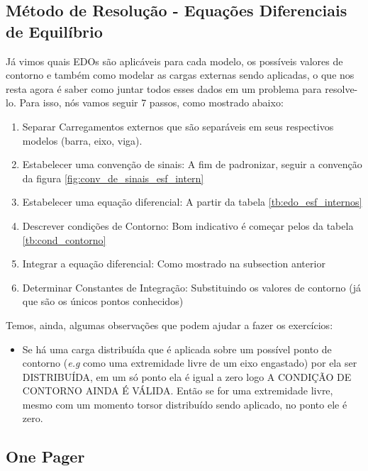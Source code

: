 \documentclass{article}
\begin{document}
            \subsection{Método de Resolução - Equações Diferenciais de Equilíbrio}
                Já vimos quais EDOs são aplicáveis para cada modelo, os possíveis valores de contorno e também como modelar as cargas externas sendo aplicadas, o que nos resta agora é saber como
                juntar todos esses dados em um problema para resolve-lo. Para isso, nós vamos seguir 7 passos, como mostrado abaixo:
                \begin{enumerate}\addtocounter{enumi}{-1}%
                    \item Separar Carregamentos externos que são separáveis em seus respectivos modelos (barra, eixo, viga).
                    \item Estabelecer uma convenção de sinais: A fim de padronizar, seguir a convenção da figura \ref{fig:conv_de_sinais_esf_intern}
                    \item Estabelecer uma equação diferencial: A partir da tabela \ref{tb:edo_esf_internos}
                    \item Descrever condições de Contorno: Bom indicativo é começar pelos da tabela \ref{tb:cond_contorno}
                    \item Integrar a equação diferencial: Como mostrado na subsection anterior
                    \item Determinar Constantes de Integração: Substituindo os valores de contorno (já que são os únicos pontos conhecidos)
                \end{enumerate}

                Temos, ainda, algumas observações que podem ajudar a fazer os exercícios:
                \begin{itemize}
                    \item Se há uma carga distribuída que é aplicada sobre um possível ponto de contorno (\emph{e.g} como uma extremidade livre de um eixo engastado) por ela ser DISTRIBUÍDA, em um só
                    ponto ela é igual a zero logo A CONDIÇÃO DE CONTORNO AINDA É VÁLIDA. Então se for uma extremidade livre, mesmo com um momento torsor distribuído sendo aplicado, no ponto ele é zero.
                \end{itemize}

                \newpage
            \subsection{One Pager}
\end{document}
